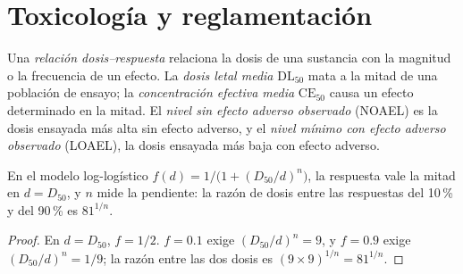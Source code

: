 \section{Toxicología y reglamentación}

\begin{definition}\label{def:b3:environmental-toxicology:dose}
Una \emph{relación dosis--respuesta} relaciona
la dosis de una sustancia con la magnitud o la frecuencia de un efecto. La \emph{dosis letal
media} $\mathrm{DL_{50}}$ mata a la mitad de una población de ensayo; la
\emph{concentración efectiva media} $\mathrm{CE_{50}}$
causa un efecto determinado en la mitad. El \emph{nivel sin efecto adverso
observado} (NOAEL) es la dosis ensayada más alta
sin efecto adverso, y el \emph{nivel mínimo con efecto adverso
observado} (LOAEL), la dosis ensayada más baja
con efecto adverso.
\end{definition}

\begin{proposition}\label{prop:b3:environmental-toxicology:dose-response}
En el modelo log-logístico $f(d) = 1/\bigl(1 + (D_{50}/d)^n\bigr)$, la respuesta vale la mitad en $d = D_{50}$, y $n$
mide la pendiente: la razón de dosis entre las respuestas del 10\,\% y del 90\,\% es $81^{1/n}$.
\end{proposition}

\begin{proof}
En $d = D_{50}$, $f = 1/2$. $f = 0.1$ exige $(D_{50}/d)^n = 9$, y $f = 0.9$ exige $(D_{50}/d)^n = 1/9$; la razón entre las dos dosis
es $(9 \times 9)^{1/n} = 81^{1/n}$.
\end{proof}

